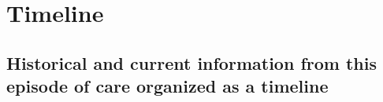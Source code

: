 \section{Timeline}
\subsection{Historical and current information from this episode of care organized as a timeline}